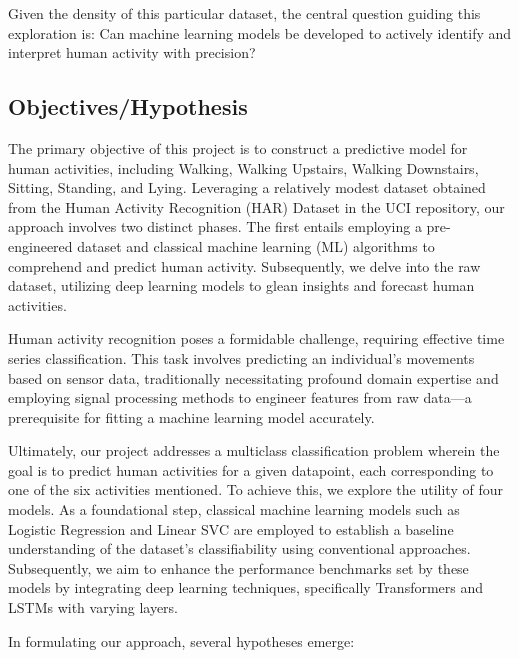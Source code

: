\documentclass[conference]{IEEEtran}
\begin{document}
Given the density of this particular dataset, the central question guiding this exploration is: Can machine learning models be developed to actively identify and interpret human activity with precision?

\subsection{Objectives/Hypothesis}
The primary objective of this project is to construct a predictive model for human activities, including Walking, Walking Upstairs, Walking Downstairs, Sitting, Standing, and Lying. Leveraging a relatively modest dataset obtained from the Human Activity Recognition (HAR) Dataset in the UCI repository, our approach involves two distinct phases. The first entails employing a pre-engineered dataset and classical machine learning (ML) algorithms to comprehend and predict human activity. Subsequently, we delve into the raw dataset, utilizing deep learning models to glean insights and forecast human activities.

Human activity recognition poses a formidable challenge, requiring effective time series classification. This task involves predicting an individual's movements based on sensor data, traditionally necessitating profound domain expertise and employing signal processing methods to engineer features from raw data—a prerequisite for fitting a machine learning model accurately.

Ultimately, our project addresses a multiclass classification problem wherein the goal is to predict human activities for a given datapoint, each corresponding to one of the six activities mentioned. To achieve this, we explore the utility of four models. As a foundational step, classical machine learning models such as Logistic Regression and Linear SVC are employed to establish a baseline understanding of the dataset's classifiability using conventional approaches. Subsequently, we aim to enhance the performance benchmarks set by these models by integrating deep learning techniques, specifically Transformers and LSTMs with varying layers.

In formulating our approach, several hypotheses emerge:
\end{document}
